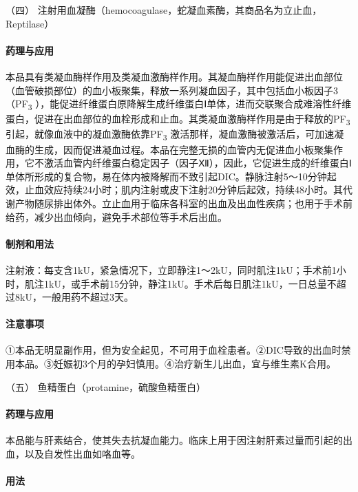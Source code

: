 \hypertarget{text00438.htmlux5cux23CHP17-8-1-4}{}
（四）
注射用血凝酶（hemocoagulase，蛇凝血素酶，其商品名为立止血，Reptilase）

\paragraph{药理与应用}

本品具有类凝血酶样作用及类凝血激酶样作用。其凝血酶样作用能促进出血部位（血管破损部位）的血小板聚集，释放一系列凝血因子，其中包括血小板因子3（PF\textsubscript{3}
），能促进纤维蛋白原降解生成纤维蛋白Ⅰ单体，进而交联聚合成难溶性纤维蛋白，促进在出血部位的血栓形成和止血。其类凝血激酶样作用是由于释放的PF\textsubscript{3}
引起，就像血液中的凝血激酶依靠PF\textsubscript{3}
激活那样，凝血激酶被激活后，可加速凝血酶的生成，因而促进凝血过程。本品在完整无损的血管内无促进血小板聚集作用，它不激活血管内纤维蛋白稳定因子（因子Ⅻ），因此，它促进生成的纤维蛋白Ⅰ单体所形成的复合物，易在体内被降解而不致引起DIC。静脉注射5～10分钟起效，止血效应持续24小时；肌内注射或皮下注射20分钟后起效，持续48小时。其代谢产物随尿排出体外。立止血用于临床各科室的出血及出血性疾病；也用于手术前给药，减少出血倾向，避免手术部位等手术后出血。

\paragraph{制剂和用法}

注射液：每支含1kU，紧急情况下，立即静注1～2kU，同时肌注1kU；手术前1小时，肌注1kU，或手术前15分钟，静注1kU。手术后每日肌注1kU，一日总量不超过8kU，一般用药不超过3天。

\paragraph{注意事项}

①本品无明显副作用，但为安全起见，不可用于血栓患者。②DIC导致的出血时禁用本品。③妊娠初3个月的孕妇慎用。④治疗新生儿出血，宜与维生素K合用。

\hypertarget{text00438.htmlux5cux23CHP17-8-1-5}{}
（五） 鱼精蛋白（protamine，硫酸鱼精蛋白）

\paragraph{药理与应用}

本品能与肝素结合，使其失去抗凝血能力。临床上用于因注射肝素过量而引起的出血，以及自发性出血如咯血等。

\paragraph{用法}

